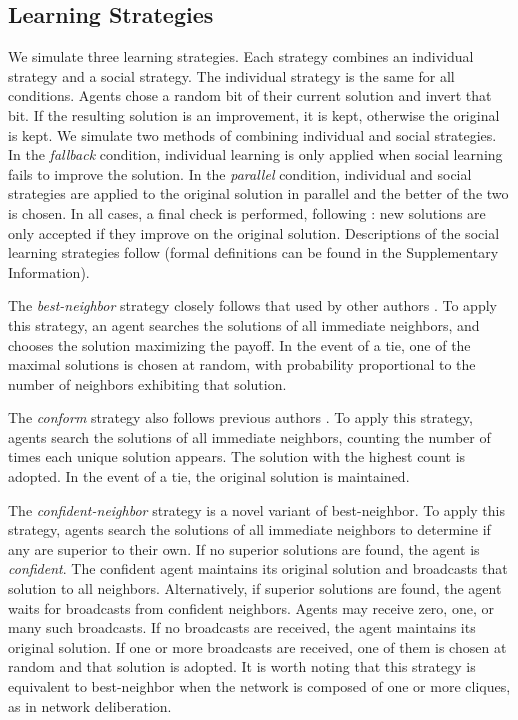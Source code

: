 \subsection{Learning Strategies}
We simulate three learning strategies. Each strategy combines an individual strategy and a social strategy. The individual strategy is the same for all conditions. Agents chose a random bit of their current solution and invert that bit. If the resulting solution is an improvement, it is kept, otherwise the original is kept.
We simulate two methods of combining individual and social strategies. In the {\em fallback} condition, individual learning is only applied when social learning fails to improve the solution.
In the {\em parallel} condition, individual and social strategies are applied to the original solution in parallel and the better of the two is chosen. In all cases, a final check is performed, following \cite{barkoczi_social_2016}: new solutions are only accepted if they improve on the original solution. Descriptions of the social learning strategies follow (formal definitions can be found in the Supplementary Information).

The {\em best-neighbor} strategy closely follows that used by other authors \cite{lazer_network_2007, barkoczi_social_2016}. To apply this strategy, an agent searches the solutions of all immediate neighbors, and chooses the solution maximizing the payoff. In the event of a tie, one of the maximal solutions is chosen at random, with probability proportional to the number of neighbors exhibiting that solution.

The {\em conform} strategy also follows previous authors \cite{barkoczi_social_2016}. To apply this strategy, agents search the solutions of all immediate neighbors, counting the number of times each unique solution appears. The solution with the highest count is adopted. In the event of a tie, the original solution is maintained.

The {\em confident-neighbor} strategy is a novel variant of best-neighbor. To apply this strategy, agents search the solutions of all immediate neighbors to determine if any are superior to their own. If no superior solutions are found, the agent is {\em confident}. The confident agent maintains its original solution and broadcasts that solution to all neighbors. Alternatively, if superior solutions are found, the agent waits for broadcasts from confident neighbors. Agents may receive zero, one, or many such broadcasts. If no broadcasts are received, the agent maintains its original solution. If one or more broadcasts are received, one of them is chosen at random and that solution is adopted. It is worth noting that this strategy is equivalent to best-neighbor when the network is composed of one or more cliques, as in network deliberation.

